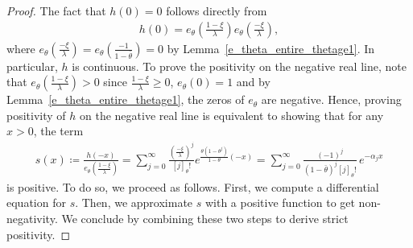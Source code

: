 \documentclass[10pt,a4paper]{amsart}
\newcommand{\1}{\mathds{1}}
\begin{document}
\begin{proof}
The fact that $h(0)=0$ follows directly from 
\begin{align*}
    h(0)={e_\theta\left(\frac{1-\xi}{\lambda}\right)}{e_\theta\left(\frac{-\xi}{\lambda}\right)},
\end{align*}
where ${e_\theta\left(\frac{-\xi}{\lambda}\right)}={e_\theta\left(\frac{-1}{ 1-\bar \theta}\right)}=0$ by Lemma~\ref{e_theta_entire_thetage1}. In particular, $h$ is continuous. To prove the positivity on the negative real line, note that
 ${e_\theta\left(\frac{1-\xi}{\lambda}\right)}>0$
since $\frac{1-\xi}{\lambda}\ge0$, $e_\theta(0)=1$ and by Lemma~\ref{e_theta_entire_thetage1}, the zeros of $e_\theta$ are negative. Hence, proving positivity of $h$ on the negative real line is equivalent to showing that for any $x>0$, the term 
\begin{align*}
    s(x)\coloneqq \frac {h(-x)}{e_\theta\left(\frac{1-\xi}{\lambda}\right)}=\sum_{j=0}^\infty \frac{\left(\frac{-\xi}{\lambda}\right)^{j}}{[j]_\theta!}e^{\frac{\theta(1-\theta^j)}{1-\theta}(-x)}=\sum_{j=0}^\infty \frac{(-1)^j}{ (1-\bar \theta)^j [j]_\theta!}\, e^{-\alpha_j x}
\end{align*}
is positive. To do so, we proceed as follows. First, we compute a differential equation for $s$. Then, we approximate $s$ with a positive function to get non-negativity. We conclude by combining these two steps to derive strict positivity.


\end{proof}
\end{document}
